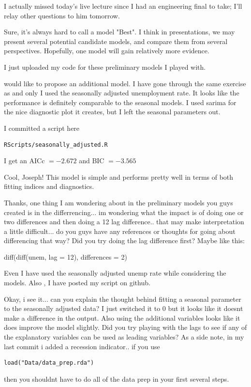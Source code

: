 \documentclass[twoside,twocolumn]{article}
\begin{document}
I actually missed today's live lecture since I had an engineering final to take; I'll relay other questions to him tomorrow.


Sure, it's always hard to call a model "Best". I think in presentations, we
may present several potential candidate models, and compare them from
several perspectives. Hopefully, one model will gain relatively more
evidence.

I just uploaded my code for these preliminary models I played with.


 would like to propose an additional model. I have gone through the same exercise as  and \@bopangpsy only I used the seasonally adjusted unemployment rate. It looks like the performance is definitely comparable to the seasonal models. I used sarima for the nice diagnostic plot it creates, but I left the seasonal parameters out.

I committed a script here \begin{verbatim}RScripts/seasonally_adjusted.R\end{verbatim}

I get an AICc \(= -2.672\) and BIC \(= -3.565\)

Cool, Joseph! This model is simple and performs pretty well in terms of
both fitting indices and diagnostics.



Thanks, one thing I am wondering about in the preliminary models you guys created is in the differrencing... im wondering what the impact is of doing one or two differences and then doing a 12 lag difference.. that may make interpretation a little difficult... do you guys have any references or thoughts for going about differencing that way? Did you try doing the lag difference first? Maybe like this:

diff(diff(unem, lag = 12), differences = 2)

Even I have used the seasonally adjusted unemp rate while considering the
models. Also , I have posted my script on github.

Okay, i see it... can you explain the thought behind fitting a seasonal parameter to the seasonally adjusted data? I just switched it to 0 but it looks like it doesnt make a difference in the output. Also using the additional variables looks like it does improve the model slightly. Did you try playing with the lags to see if any of the explanatory variables can be used as leading variables? As a side note, in my last commit i added a recession indicator.. if you use \begin{verbatim}load("Data/data_prep.rda")\end{verbatim} then you shouldnt have to do all of the data prep in your first several steps.
\end{document}
